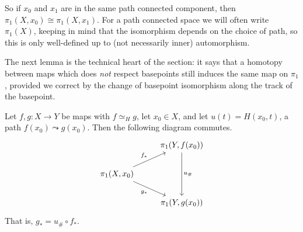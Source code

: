 \documentclass[a4paper]{scrartcl}
\begin{document}
So if $x_0$ and $x_1$ are in the same path connected component, then
$\pi_1(X, x_0) \cong \pi_1(X, x_1)$. For a path connected space we will often write
$\pi_1(X)$, keeping in mind that the isomorphism depends on the choice of path, so this
is only well-defined up to (not necessarily inner) automorphism.

The next lemma is the technical heart of the section: it says that a homotopy between
maps which does \emph{not} respect basepoints still induces the same map on $\pi_1$,
provided we correct by the change of basepoint isomorphism along the track of the
basepoint.

\begin{lemma} \label{lem:homotopy-basepoint}
	Let $f, g: X \to Y$ be maps with $f \simeq_H g$, let $x_0 \in X$, and let $u(t) = H(x_0, t)$, a path $f(x_0) \leadsto g(x_0)$. Then the following diagram commutes.
	\[\begin{tikzcd}
		& {\pi_1(Y, f(x_0))} \\
		{\pi_1(X, x_0)} \\
		& {\pi_1(Y, g(x_0))}
		\arrow["{f_*}", from=2-1, to=1-2]
		\arrow["{u_\#}", from=1-2, to=3-2]
		\arrow["{g_*}"', from=2-1, to=3-2]
	\end{tikzcd}\]
	That is, $g_* = u_\# \circ f_*$.
\end{lemma}
\end{document}
